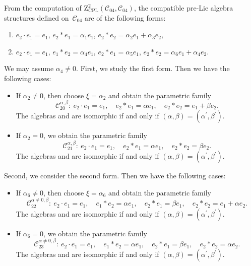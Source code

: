 \documentclass[10pt,a4paper]{amsart}
\numberwithin{equation}{section}
\begin{document}
From the computation of $\mathrm{Z}_{\mathrm{CPL}}^{2}(\mathcal{C}_{04},
\mathcal{C}_{04})$, the compatible pre-Lie algebra structures defined on~$\mathcal{C}_{04}$ are of the following forms:
\begin{enumerate}\itemsep=0pt
\item[(1)] $e_{2}\cdot e_{1}=e_{1}$,
$e_{2}\ast e_{1}=\alpha _{1}e_{1}$, $e_{2}\ast e_{2}=\alpha
_{2}e_{1}+\alpha _{3}e_{2}$,
\item[(2)] $e_{2}\cdot e_{1}=e_{1}$,
$e_{1}\ast e_{2}=\alpha _{4}e_{1}$, $e_{2}\ast e_{1}=\alpha _{5}e_{1}$, $e_{2}\ast e_{2}=\alpha _{6}e_{1}+\alpha _{4}e_{2}$.
\end{enumerate}

We may assume $\alpha _{4}\neq 0$.
First, we study the first form. Then
we have the following cases:
\begin{itemize}\itemsep=0pt
\item If $\alpha _{2}\neq 0$, then choose $\xi =\alpha _{2}$ and
obtain the parametric family
\[
\mathcal{C}_{20}^{\alpha ,\beta } \colon \
e_{2}\cdot e_{1}=e_{1}, \quad
e_{2}\ast e_{1}=\alpha e_{1}, \quad e_{2}\ast e_{2}=e_{1}+\beta e_{2}.
\]
The algebras  and \smash{$\mathcal{C}_{20}^{\alpha
^{\prime },\beta ^{\prime }}$} are isomorphic if and only if $(\alpha,\beta)= (\alpha^{\prime },\beta ^{\prime })$.

\item If $\alpha _{2}=0$, we obtain the parametric family
\[
\mathcal{C}_{21}^{\alpha ,\beta } \colon \
e_{2}\cdot e_{1}=e_{1}, \quad
e_{2}\ast e_{1}=\alpha e_{1},\quad e_{2}\ast e_{2}=\beta e_{2}.
\]
The algebras \smash{$\mathcal{C}_{21}^{\alpha ,\beta }$} and  are isomorphic if and only if $(\alpha,\beta)= (\alpha^{\prime },\beta ^{\prime })$.
\end{itemize}

Second, we consider the second form. Then we have the following cases:
\begin{itemize}\itemsep=0pt
\item If $\alpha _{6}\neq 0$, then choose $\xi =\alpha _{6}$ and
obtain the parametric family
\[
\mathcal{C}_{22}^{\alpha \neq 0,\beta } \colon \
e_{2}\cdot e_{1}=e_{1}, \quad
e_{1}\ast e_{2}=\alpha e_{1}, \quad e_{2}\ast e_{1}=\beta e_{1},\quad
e_{2}\ast e_{2}=e_{1}+\alpha e_{2}.
\]
The algebras \smash{$\mathcal{C}_{22}^{\alpha ,\beta }$} and \smash{$\mathcal{C}_{22}^{\alpha
^{\prime },\beta ^{\prime }}$} are isomorphic if and only if $(\alpha,\beta)= (\alpha^{\prime },\beta ^{\prime })$.

\item If $\alpha _{6}=0$, we obtain the parametric family
\[
\mathcal{C}_{23}^{\alpha \neq 0,\beta } \colon \
e_{2}\cdot e_{1}=e_{1}, \quad
e_{1}\ast e_{2}=\alpha e_{1}, \quad e_{2}\ast e_{1}=\beta e_{1}, \quad
e_{2}\ast e_{2}=\alpha e_{2}.
\]
The algebras  and \smash{$\mathcal{C}_{23}^{\alpha
^{\prime },\beta ^{\prime }}$} are isomorphic if and only if $(\alpha,\beta)= (\alpha^{\prime },\beta ^{\prime })$.
\end{itemize}
\end{document}
